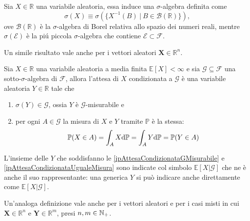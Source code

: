     \begin{dfn}
      Sia \(X\in\mathbb R\) una variabile aleatoria, essa induce una \(\sigma\)-algebra definita come
      \[
        \sigma(X)\equiv\sigma(\{X^{-1}(B)\ |\ B\in\mathcal B(\mathbb R)\}),
      \]
      ove \(\mathcal B(\mathbb R)\) è la \(\sigma\)-algebra di Borel relativa allo spazio dei numeri reali, mentre \(\sigma(\mathcal E)\) è la piú piccola \(\sigma\)-algebra che contiene \(\mathcal E\subset\mathcal F\).

      Un simile risultato vale anche per i vettori aleatori \(\mathbf X\in\mathbb R^n\).
    \end{dfn}

    \begin{dfn}
      \label{defValoreAttesoCondizionato}
      Sia \(X\in\mathbb R\) una variabile aleatoria a media finita \(\mathbb E[X]<\infty\) e sia \(\mathcal G\subseteq\mathcal F\) una sotto-\(\sigma\)-algebra di \(\mathcal F\), allora l'attesa di \(X\) condizionata a \(\mathcal G\) è una variabile aleatoria \(Y\in\mathbb R\) tale che

      \begin{enumerate}[
        label=AC\arabic*,
        topsep=0.5em,
        parsep=0em,
        itemsep=0.25em,
        leftmargin=3em,
        rightmargin=1.5em,
      ]
        \item\label{ipAttesaCondizionataGMisurabile} \(\sigma(Y)\in\mathcal G\), ossia \(Y\) è \(\mathcal G\)-misurabile e
        \item\label{ipAttesaCondizionataUgualeMisura} per ogni \(A\in\mathcal G\) la misura di \(X\) e \(Y\) tramite \(\mathbb P\) è la stessa:
          \[
            \mathbb P(X\in A)=\int_AX\mathrm{d}\mathbb P=\int_AY\mathrm{d}\mathbb P=\mathbb P(Y\in A)
          \]
      \end{enumerate}

      L'insieme delle \(Y\) che soddisfanno le \ref{ipAttesaCondizionataGMisurabile} e \ref{ipAttesaCondizionataUgualeMisura} sono indicate col simbolo \(\mathbb E[X|\mathcal G]\) che ne è anche il suo rappresentante: una generica \(Y\) si può indicare anche direttamente come \(\mathbb E[X|\mathcal G]\).

      Un'analoga definizione vale anche per i vettori aleatori e per i casi misti in cui \(\mathbf X\in\mathbb R^n\) e \(\mathbf Y\in\mathbb R^m\), presi \(n,m\in\mathbb N_+\).
    \end{dfn}

